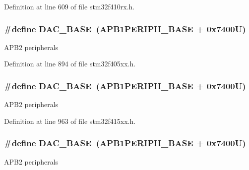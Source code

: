 Definition at line 609 of file stm32f410rx.\+h.

\subsubsection[{\texorpdfstring{D\+A\+C\+\_\+\+B\+A\+SE}{DAC_BASE}}]{\setlength{\rightskip}{0pt plus 5cm}\#define D\+A\+C\+\_\+\+B\+A\+SE~({\bf A\+P\+B1\+P\+E\+R\+I\+P\+H\+\_\+\+B\+A\+SE} + 0x7400\+U)}\hypertarget{group___peripheral__registers__structures_gad18d0b914c7f68cecbee1a2d23a67d38}{}\label{group___peripheral__registers__structures_gad18d0b914c7f68cecbee1a2d23a67d38}
A\+P\+B2 peripherals 

Definition at line 894 of file stm32f405xx.\+h.

\subsubsection[{\texorpdfstring{D\+A\+C\+\_\+\+B\+A\+SE}{DAC_BASE}}]{\setlength{\rightskip}{0pt plus 5cm}\#define D\+A\+C\+\_\+\+B\+A\+SE~({\bf A\+P\+B1\+P\+E\+R\+I\+P\+H\+\_\+\+B\+A\+SE} + 0x7400\+U)}\hypertarget{group___peripheral__registers__structures_gad18d0b914c7f68cecbee1a2d23a67d38}{}\label{group___peripheral__registers__structures_gad18d0b914c7f68cecbee1a2d23a67d38}
A\+P\+B2 peripherals 

Definition at line 963 of file stm32f415xx.\+h.

\subsubsection[{\texorpdfstring{D\+A\+C\+\_\+\+B\+A\+SE}{DAC_BASE}}]{\setlength{\rightskip}{0pt plus 5cm}\#define D\+A\+C\+\_\+\+B\+A\+SE~({\bf A\+P\+B1\+P\+E\+R\+I\+P\+H\+\_\+\+B\+A\+SE} + 0x7400\+U)}\hypertarget{group___peripheral__registers__structures_gad18d0b914c7f68cecbee1a2d23a67d38}{}\label{group___peripheral__registers__structures_gad18d0b914c7f68cecbee1a2d23a67d38}
A\+P\+B2 peripherals 

